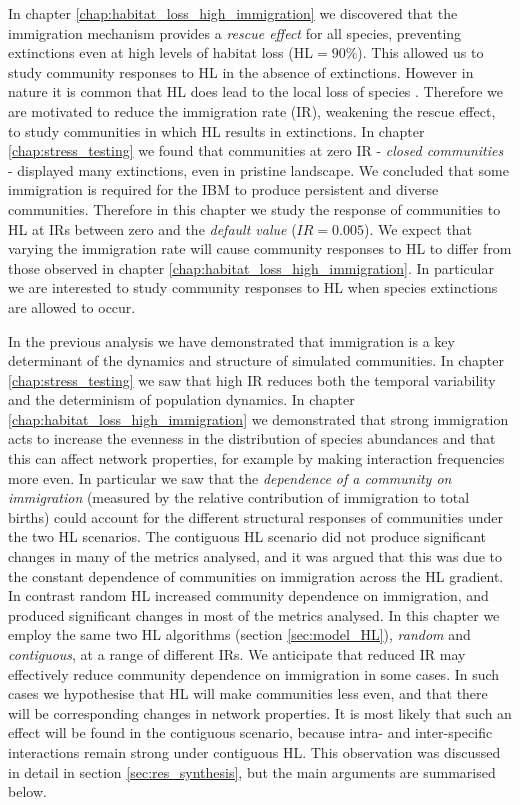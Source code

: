 In chapter \ref{chap:habitat_loss_high_immigration} we discovered that the immigration mechanism provides a \emph{rescue effect} for all species, preventing extinctions even at high levels of habitat loss (HL$=90\%$). This allowed us to study community responses to HL in the absence of extinctions. However in nature it is common that HL does lead to the local loss of species \cite{foley2005global}. Therefore we are motivated to reduce the immigration rate (IR), weakening the rescue effect, to study communities in which HL results in extinctions. In chapter \ref{chap:stress_testing} we found that communities at zero IR - \emph{closed communities} - displayed many extinctions, even in pristine landscape. We concluded that some immigration is required for the IBM to produce persistent and diverse communities. Therefore in this chapter we study the response of communities to HL at IRs between zero and the \emph{default value} ($IR=0.005$). We expect that varying the immigration rate will cause community responses to HL to differ from those observed in chapter \ref{chap:habitat_loss_high_immigration}. In particular we are interested to study community responses to HL when species extinctions are allowed to occur.

In the previous analysis we have demonstrated that immigration is a key determinant of the dynamics and structure of simulated communities. In chapter \ref{chap:stress_testing} we saw that high IR reduces both the temporal variability and the determinism of population dynamics. In chapter \ref{chap:habitat_loss_high_immigration} we demonstrated that strong immigration acts to increase the evenness in the distribution of species abundances and that this can affect network properties, for example by making interaction frequencies more even. In particular we saw that the \emph{dependence of a community on immigration} (measured by the relative contribution of immigration to total births) could account for the different structural responses of communities under the two HL scenarios. The contiguous HL scenario did not produce significant changes in many of the metrics analysed, and it was argued that this was due to the constant dependence of communities on immigration across the HL gradient. In contrast random HL increased community dependence on immigration, and produced significant changes in most of the metrics analysed. In this chapter we employ the same two HL algorithms (section \ref{sec:model_HL}), \emph{random} and \emph{contiguous}, at a range of different IRs. We anticipate that reduced IR may effectively reduce community dependence on immigration in some cases. In such cases we hypothesise that HL will make communities less even, and that there will be corresponding changes in network properties. It is most likely that such an effect will be found in the contiguous scenario, because intra- and inter-specific interactions remain strong under contiguous HL. This observation was discussed in detail in section \ref{sec:res_synthesis}, but the main arguments are summarised below.

